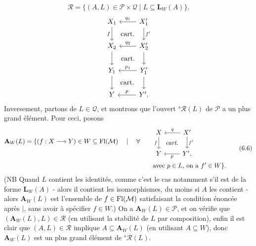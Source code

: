 \[
\mathcal{R}=\{(A,L)\in\mathcal{P}\times\mathcal{Q}\mid L\subseteq\mathbf{L}_W(A)\}.
\tag*{(6.5)}
\]
\[
\begin{tikzcd}
X_1 \arrow[d, "f"'] \arrow[dr, phantom, "\text{cart.}"] & X'_1 \arrow[l, "q_1"'] \arrow[d, "f'"] \\
X_2 \arrow[d] \arrow[dr, phantom, "\text{cart.}"] & X'_2 \arrow[l, "q_2"'] \arrow[d] \\
Y_1 \arrow[d] \arrow[dr, phantom, "\text{cart.}"] & Y'_1 \arrow[l, "p_1"'] \arrow[d] \\
Y & Y'. \arrow[l, "p"']
\end{tikzcd}
\]
Inversement, partons de $L\in\mathcal{Q}$, et montrons que l'ouvert ${}^{s}\mathcal{R}(L)$ de $\mathcal{P}$ a un plus grand élément. Pour ceci, posons
\[
\begin{aligned}
\mathbf{A}_W(L)=\{(f : X\longrightarrow Y)\in W\subseteq\Fl(\mathcal{M})\quad\mid\quad\forall\qquad
&\begin{tikzcd}[ampersand replacement=\&]
X \arrow[d, "f"'] \arrow[dr, phantom, "\textit{cart.}"] \& X' \arrow[l, "q"'] \arrow[d, "f'"] \\
Y \& Y', \arrow[l, "p"]
\end{tikzcd}\\
&\text{avec $p\in L$, on a $f'\in W$}\}.
\end{aligned}
\tag*{(6.6)}
\]
(NB Quand $L$ contient les identités, comme c'est le cas notamment s'il est de la forme $\mathbf{L}_W(A)$ - alors il contient les isomorphismes, du moins si $A$ les contient - alors $\mathbf{A}_W(L)$ est l'ensemble de $f\in\mathrm{Fl}(\mathcal{M})$ satisfaisant la condition énoncée après $|$, sans avoir à spécifier $f\in W$.) On a $\mathbf{A}_W(L)\in\mathcal{P}$, et on vérifie que $(\mathbf{A}_W(L),L)\in\mathcal{R}$ (en utilisant la stabilité de $L$ par composition), enfin il est clair que $(A,L)\in\mathcal{R}$ implique $A\subseteq\mathbf{A}_W(L)$ (en utilisant $A\subseteq W$), donc $\mathbf{A}_W(L)$ est un plus grand élément de ${}^{s}\mathcal{R}(L)$.

